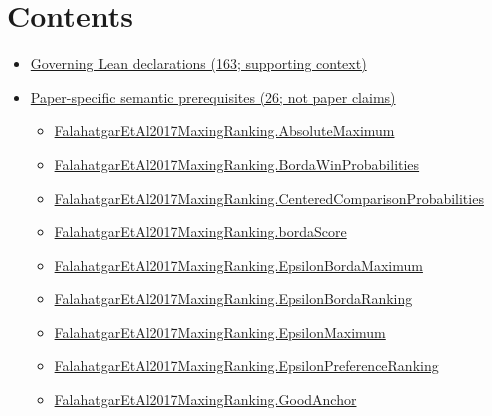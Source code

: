 \documentclass[10pt]{article}
\begin{document}
\section*{Contents}
\begin{itemize}[leftmargin=1.2em]
\item \hyperlink{governing-declaration-section-5ef5ef0364b6939c}{Governing Lean declarations (163; supporting context)}
\item \hyperlink{paper-prerequisite-section-5ef5ef0364b6939c}{Paper-specific semantic prerequisites (26; not paper claims)}
\begin{itemize}[leftmargin=1.2em]
\item \hyperlink{paper-prerequisite-9c0d6111ba7505a4}{Falahatgar\allowbreak{}Et\allowbreak{}Al2017\allowbreak{}Maxing\allowbreak{}Ranking.\allowbreak{}Absolute\allowbreak{}Maximum}
\item \hyperlink{paper-prerequisite-5ac1483a89567450}{Falahatgar\allowbreak{}Et\allowbreak{}Al2017\allowbreak{}Maxing\allowbreak{}Ranking.\allowbreak{}Borda\allowbreak{}Win\allowbreak{}Probabilities}
\item \hyperlink{paper-prerequisite-b99b697ef57f53ce}{Falahatgar\allowbreak{}Et\allowbreak{}Al2017\allowbreak{}Maxing\allowbreak{}Ranking.\allowbreak{}Centered\allowbreak{}Comparison\allowbreak{}Probabilities}
\item \hyperlink{paper-prerequisite-671eb60c445d7522}{Falahatgar\allowbreak{}Et\allowbreak{}Al2017\allowbreak{}Maxing\allowbreak{}Ranking.\allowbreak{}borda\allowbreak{}Score}
\item \hyperlink{paper-prerequisite-a5100f536aff284b}{Falahatgar\allowbreak{}Et\allowbreak{}Al2017\allowbreak{}Maxing\allowbreak{}Ranking.\allowbreak{}Epsilon\allowbreak{}Borda\allowbreak{}Maximum}
\item \hyperlink{paper-prerequisite-7a741c130d5e42b2}{Falahatgar\allowbreak{}Et\allowbreak{}Al2017\allowbreak{}Maxing\allowbreak{}Ranking.\allowbreak{}Epsilon\allowbreak{}Borda\allowbreak{}Ranking}
\item \hyperlink{paper-prerequisite-f40acf814741691d}{Falahatgar\allowbreak{}Et\allowbreak{}Al2017\allowbreak{}Maxing\allowbreak{}Ranking.\allowbreak{}Epsilon\allowbreak{}Maximum}
\item \hyperlink{paper-prerequisite-4d3d96fb13998c50}{Falahatgar\allowbreak{}Et\allowbreak{}Al2017\allowbreak{}Maxing\allowbreak{}Ranking.\allowbreak{}Epsilon\allowbreak{}Preference\allowbreak{}Ranking}
\item \hyperlink{paper-prerequisite-46128be8e1edb4b6}{Falahatgar\allowbreak{}Et\allowbreak{}Al2017\allowbreak{}Maxing\allowbreak{}Ranking.\allowbreak{}Good\allowbreak{}Anchor}

\end{itemize}
\end{itemize}
\end{document}
